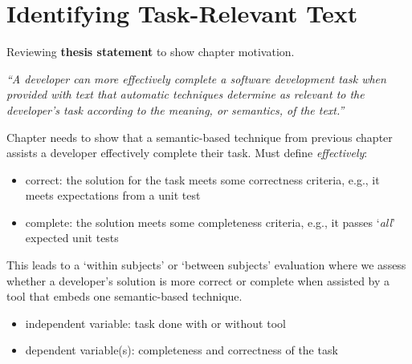 \setcounter{chapter}{5}
\setcounter{rq}{1}


\chapter{Identifying Task-Relevant Text}
\label{ch:assisting}





Reviewing \textbf{thesis statement} to show chapter motivation.

\medskip
\textit{
    ``A developer can more effectively complete a software development task when provided
    with text that automatic techniques determine as relevant to the developer's task 
    according to the meaning, or semantics, of the text.''    
}

\medskip


Chapter needs to show that a semantic-based technique from previous chapter assists a 
developer effectively complete their task. Must define \textit{effectively}: 

\begin{itemize}
    \item correct: the solution for the task meets some correctness criteria, e.g., it meets expectations from a unit test
    \item complete: the solution meets some completeness criteria, e.g., it passes `\textit{all}' expected unit tests
\end{itemize}


This leads to a `within subjects' or `between subjects' evaluation where we assess whether 
a developer's solution is more correct or complete
 when assisted by a tool that embeds one semantic-based technique.

\begin{itemize}
\item independent variable: task done with or without tool
\item dependent variable(s): completeness and correctness of the task
\end{itemize}


\clearpage





% 

% 



% 


